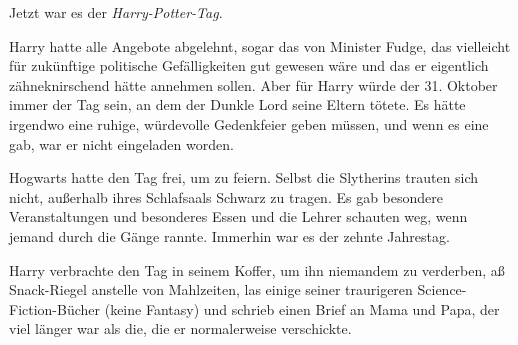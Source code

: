 Jetzt war es der \emph{Harry-Potter-Tag}.

Harry hatte alle Angebote abgelehnt, sogar das von Minister Fudge, das
vielleicht für zukünftige politische Gefälligkeiten gut gewesen wäre und das er
eigentlich zähneknirschend hätte annehmen sollen. Aber für Harry würde der 31.
Oktober immer der Tag sein, an dem der Dunkle Lord seine Eltern tötete. Es hätte
irgendwo eine ruhige, würdevolle Gedenkfeier geben müssen, und wenn es eine gab,
war er nicht eingeladen worden.

Hogwarts hatte den Tag frei, um zu feiern. Selbst die Slytherins trauten sich
nicht, außerhalb ihres Schlafsaals Schwarz zu tragen. Es gab besondere
Veranstaltungen und besonderes Essen und die Lehrer schauten weg, wenn jemand
durch die Gänge rannte. Immerhin war es der zehnte Jahrestag.

Harry verbrachte den Tag in seinem Koffer, um ihn niemandem zu verderben, aß
Snack-Riegel anstelle von Mahlzeiten, las einige seiner traurigeren
Science-Fiction-Bücher (keine Fantasy) und schrieb einen Brief an Mama und Papa,
der viel länger war als die, die er normalerweise verschickte.
